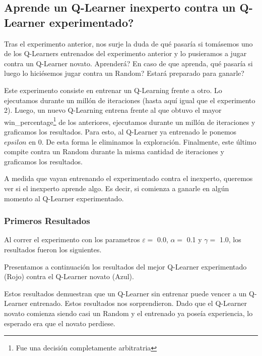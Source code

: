 \subsection{Aprende un Q-Learner inexperto contra un Q-Learner experimentado?}

Tras el experimento anterior, nos surje la duda de qué pasaría si tomásemos uno de los Q-Learners entrenados del experimento anterior y lo pusieramos a jugar contra un Q-Learner novato. Aprenderá? En caso de que aprenda, qué pasaría si luego lo hiciésemos jugar contra un Random? Estará preparado para ganarle?

Este experimento consiste en entrenar un Q-Learning frente a otro. Lo ejecutamos durante un mill\'on de iteraciones (hasta aqu\'i igual que el experimento 2). Luego, un nuevo Q-Learning entrena frente al que obtuvo el mayor win\_percentage\footnote{Fue una decisi\'on completamente arbitratria} de los anteriores, ejecutamos durante un mill\'on de iteraciones y graficamos los resultados. Para esto, al Q-Learner ya entrenado le ponemos $epsilon$ en 0. De esta forma le eliminamos la exploración. Finalmente, este \'ultimo compite contra un Random durante la misma cantidad de iteraciones y graficamos los resultados.

A medida que vayan entrenando el experimentado contra el inexperto, queremos ver si el inexperto aprende algo. Es decir, si comienza a ganarle en algún momento al Q-Learner experimentado.

\subsubsection{Primeros Resultados} %

Al correr el experimento con los parametros $\varepsilon = $ 0.0, $\alpha = $ 0.1 y $\gamma = $ 1.0, los resultados fueron los siguientes.

Presentamos a continuación los resultados del mejor Q-Learner experimentado (Rojo) contra el Q-Learner novato (Azul).



Estos resultados demuestran que un Q-Learner sin entrenar puede vencer a un Q-Learner entrenado. Estos resultados nos sorprendieron. Dado que el Q-Learner novato comienza siendo casi un Random y el entrenado ya poseía experiencia, lo esperado era que el novato perdiese.

